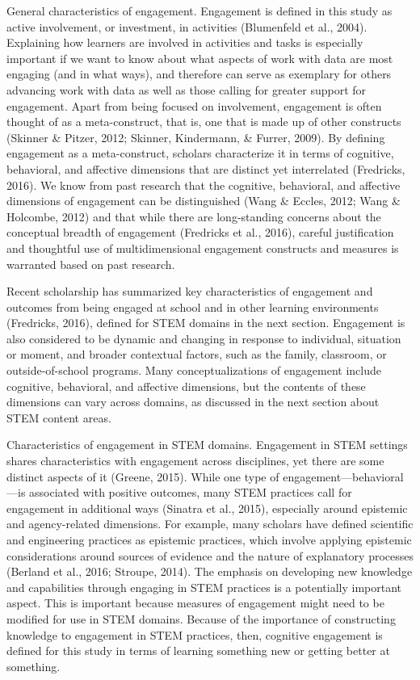 \documentclass[]{book}
\theoremstyle{definition}
\theoremstyle{definition}
\theoremstyle{definition}
\theoremstyle{remark}
\begin{document}
General characteristics of engagement. Engagement is defined in this
study as active involvement, or investment, in activities (Blumenfeld et
al., 2004). Explaining how learners are involved in activities and tasks
is especially important if we want to know about what aspects of work
with data are most engaging (and in what ways), and therefore can serve
as exemplary for others advancing work with data as well as those
calling for greater support for engagement. Apart from being focused on
involvement, engagement is often thought of as a meta-construct, that
is, one that is made up of other constructs (Skinner \& Pitzer, 2012;
Skinner, Kindermann, \& Furrer, 2009). By defining engagement as a
meta-construct, scholars characterize it in terms of cognitive,
behavioral, and affective dimensions that are distinct yet interrelated
(Fredricks, 2016). We know from past research that the cognitive,
behavioral, and affective dimensions of engagement can be distinguished
(Wang \& Eccles, 2012; Wang \& Holcombe, 2012) and that while there are
long-standing concerns about the conceptual breadth of engagement
(Fredricks et al., 2016), careful justification and thoughtful use of
multidimensional engagement constructs and measures is warranted based
on past research.

Recent scholarship has summarized key characteristics of engagement and
outcomes from being engaged at school and in other learning environments
(Fredricks, 2016), defined for STEM domains in the next section.
Engagement is also considered to be dynamic and changing in response to
individual, situation or moment, and broader contextual factors, such as
the family, classroom, or outside-of-school programs. Many
conceptualizations of engagement include cognitive, behavioral, and
affective dimensions, but the contents of these dimensions can vary
across domains, as discussed in the next section about STEM content
areas.

Characteristics of engagement in STEM domains. Engagement in STEM
settings shares characteristics with engagement across disciplines, yet
there are some distinct aspects of it (Greene, 2015). While one type of
engagement---behavioral---is associated with positive outcomes, many
STEM practices call for engagement in additional ways (Sinatra et al.,
2015), especially around epistemic and agency-related dimensions. For
example, many scholars have defined scientific and engineering practices
as epistemic practices, which involve applying epistemic considerations
around sources of evidence and the nature of explanatory processes
(Berland et al., 2016; Stroupe, 2014). The emphasis on developing new
knowledge and capabilities through engaging in STEM practices is a
potentially important aspect. This is important because measures of
engagement might need to be modified for use in STEM domains. Because of
the importance of constructing knowledge to engagement in STEM
practices, then, cognitive engagement is defined for this study in terms
of learning something new or getting better at something.
\end{document}
